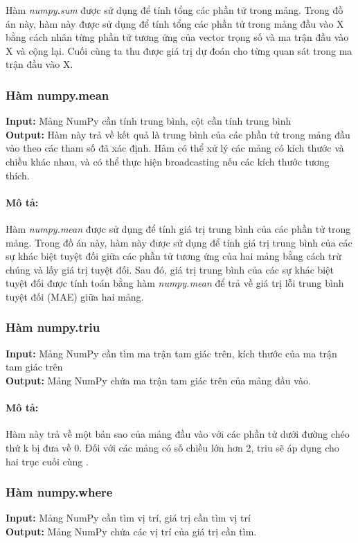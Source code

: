 \documentclass[]{article}
\begin{document}
Hàm \textit{numpy.sum} \cite{numpyNumpysum} được sử dụng để tính tổng các phần tử trong mảng. Trong đồ án này, hàm này được sử dụng để tính tổng các phần tử trong mảng đầu vào X bằng cách nhân từng phần tử tương ứng của vector trọng số và ma trận đầu vào X và cộng lại. Cuối cùng ta thu được giá trị dự đoán cho từng quan sát trong ma trận đầu vào X.
 
\subsubsection{Hàm numpy.mean} \label{mean}
\noindent
\textbf{Input:} Mảng NumPy cần tính trung bình, cột cần tính trung bình \\
\textbf{Output:} Hàm này trả về kết quả là trung bình của các phần tử trong mảng đầu vào theo các tham số đã xác định. Hàm có thể xử lý các mảng có kích thước và chiều khác nhau, và có thể thực hiện broadcasting nếu các kích thước tương thích.
\paragraph{Mô tả:}
Hàm \textit{numpy.mean} \cite{numpyNumpymean} được sử dụng để tính giá trị trung bình của các phần tử trong mảng. Trong đồ án này, hàm này được sử dụng để tính giá trị trung bình của các sự khác biệt tuyệt đối giữa các phần tử tương ứng của hai mảng bằng cách trừ chúng và lấy giá trị tuyệt đối. Sau đó, giá trị trung bình của các sự khác biệt tuyệt đối được tính toán bằng hàm \textit{numpy.mean} để trả về giá trị lỗi trung bình tuyệt đối (MAE) giữa hai mảng.

\subsubsection{Hàm numpy.triu}
\noindent
\textbf{Input:} Mảng NumPy cần tìm ma trận tam giác trên, kích thước của ma trận tam giác trên \\
\textbf{Output:} Mảng NumPy chứa ma trận tam giác trên của mảng đầu vào.
\paragraph{Mô tả:}
Hàm này trả về một bản sao của mảng đầu vào với các phần tử dưới đường chéo thứ k bị đưa về 0. Đối với các mảng có số chiều lớn hơn 2, triu sẽ áp dụng cho hai trục cuối cùng \cite{numpyNumpytriu}.

\subsubsection{Hàm numpy.where}
\noindent
\textbf{Input:} Mảng NumPy cần tìm vị trí, giá trị cần tìm vị trí \\
\textbf{Output:} Mảng NumPy chứa các vị trí của giá trị cần tìm.
\end{document}
